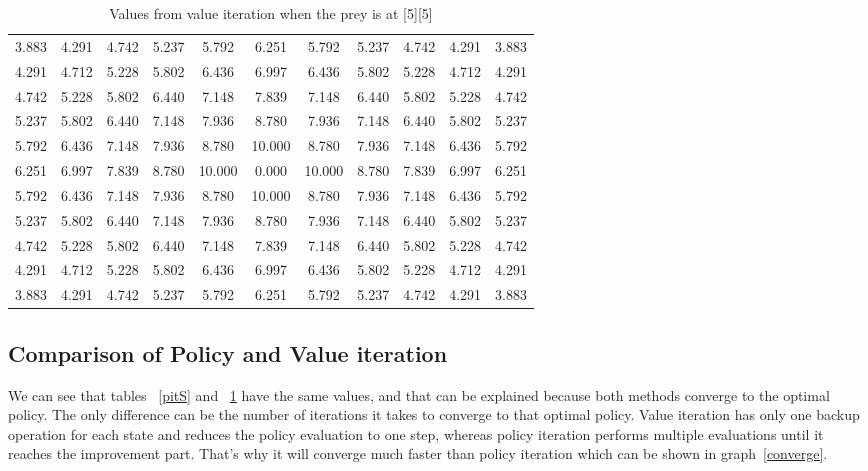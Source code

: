 \documentclass[paper=a4, fontsize=11pt]{scrartcl}
\numberwithin{equation}{section}		%
\numberwithin{figure}{section}			%
\numberwithin{table}{section}				%
\begin{document}
\begin{table}[H]
\caption{Values from value iteration when the prey is at [5][5]}
\centering
\begin{tabular}{l*{9}{c}r}
  \hline
3.883 & 4.291 & 4.742 & 5.237 & 5.792 & 6.251 & 5.792 & 5.237 & 4.742 & 4.291 & 3.883 \\
4.291 & 4.712 & 5.228 & 5.802 & 6.436 & 6.997 & 6.436 & 5.802 & 5.228 & 4.712 & 4.291 \\
4.742 & 5.228 & 5.802 & 6.440 & 7.148 & 7.839 & 7.148 & 6.440 & 5.802 & 5.228 & 4.742 \\
5.237 & 5.802 & 6.440 & 7.148 & 7.936 & 8.780 & 7.936 & 7.148 & 6.440 & 5.802 & 5.237 \\
5.792 & 6.436 & 7.148 & 7.936 & 8.780 & 10.000 & 8.780 & 7.936 & 7.148 & 6.436 & 5.792 \\
6.251 & 6.997 & 7.839 & 8.780 & 10.000 & 0.000 & 10.000 & 8.780 & 7.839 & 6.997 & 6.251 \\
5.792 & 6.436 & 7.148 & 7.936 & 8.780 & 10.000 & 8.780 & 7.936 & 7.148 & 6.436 & 5.792 \\
5.237 & 5.802 & 6.440 & 7.148 & 7.936 & 8.780 & 7.936 & 7.148 & 6.440 & 5.802 & 5.237 \\
4.742 & 5.228 & 5.802 & 6.440 & 7.148 & 7.839 & 7.148 & 6.440 & 5.802 & 5.228 & 4.742 \\
4.291 & 4.712 & 5.228 & 5.802 & 6.436 & 6.997 & 6.436 & 5.802 & 5.228 & 4.712 & 4.291 \\
3.883 & 4.291 & 4.742 & 5.237 & 5.792 & 6.251 & 5.792 & 5.237 & 4.742 & 4.291 & 3.883
\end{tabular}
\label{vitS}
\end{table}
\subsection{Comparison of Policy and Value iteration}
We can see that tables ~\ref{pitS}  and ~\ref{vitS} have the same values, and that can be explained because both methods converge to the optimal policy. The only difference can be the number of iterations it takes to converge to that optimal policy. Value iteration has only one backup operation for each state and reduces the policy evaluation to one step, whereas policy iteration performs multiple evaluations until it reaches the improvement part. That's why it will converge much faster than policy iteration which can be shown in graph~\ref{converge}. 
\end{document}
